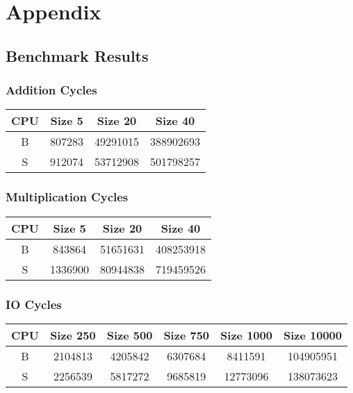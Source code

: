 \chapter{Appendix}
\label{ch:appendix}
\section{Benchmark Results}
\subsection{Addition Cycles}
\begin{center}
        \begin{tabular}{c c c c}
            \hline
            CPU & Size 5 & Size 20 & Size 40 \\
            \hline
            B & 807283 & 49291015 & 388902693 \\
            \hline
            S & 912074 & 53712908 & 501798257 \\
            \hline
        \end{tabular}
\end{center}
\subsection{Multiplication Cycles}
\begin{center}
    \begin{tabular}{c c c c}
        \hline
        CPU & Size 5 & Size 20 & Size 40 \\
        \hline
        B & 843864 & 51651631 & 408253918 \\
        \hline
        S & 1336900 & 80944838 & 719459526 \\
        \hline
    \end{tabular}
\end{center}
\subsection{IO Cycles}
\begin{center}
    \begin{tabular}{c c c c c c}
        \hline
        CPU & Size 250 & Size 500 & Size 750 & Size 1000 & Size 10000 \\
        \hline
        B & 2104813 & 4205842 & 6307684 & 8411591 & 104905951 \\
        \hline
        S & 2256539 & 5817272 & 9685819 & 12773096 & 138073623 \\
        \hline
    \end{tabular}
\end{center}

